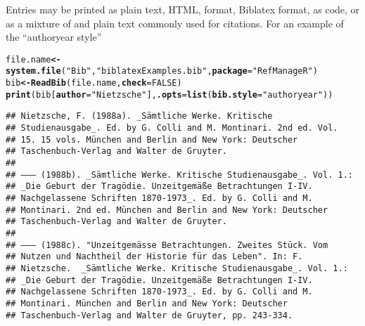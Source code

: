 \documentclass[article]{jss}\usepackage[]{graphicx}\usepackage[]{color}
\makeatletter
\newcommand{\hlnum}[1]{\textcolor[rgb]{0.125,0.125,1}{#1}}%
\newcommand{\hlstr}[1]{\textcolor[rgb]{0.125,0.125,1}{#1}}%
\newcommand{\hlstd}[1]{\textcolor[rgb]{0.251,0.251,0.282}{#1}}%
\newcommand{\hlkwb}[1]{\textcolor[rgb]{0.439,0.251,1}{\textbf{#1}}}%
\newcommand{\hlkwc}[1]{\textcolor[rgb]{0.529,0,0.184}{\textbf{#1}}}%
\newcommand{\hlkwd}[1]{\textcolor[rgb]{0.251,0.251,0.282}{\textbf{#1}}}%
\newenvironment{kframe}{%
 \def\at@end@of@kframe{}%
 \ifinner\ifhmode%
  \def\at@end@of@kframe{\end{minipage}}%
  \begin{minipage}{\columnwidth}%
 \fi\fi%
 \def\FrameCommand##1{\hskip\@totalleftmargin \hskip-\fboxsep
 \colorbox{shadecolor}{##1}\hskip-\fboxsep
     \hskip-\linewidth \hskip-\@totalleftmargin \hskip\columnwidth}%
 \MakeFramed {\advance\hsize-\width
   \@totalleftmargin\z@ \linewidth\hsize
   \@setminipage}}%
 {\par\unskip\endMakeFramed%
 \at@end@of@kframe}
\newenvironment{knitrout}{}{} %
\makeatother
\begin{document}
Entries may be printed as plain text, HTML, \Bibtex{} format, Biblatex{} format, as \R{} code, or as a mixture of \Bibtex and plain text commonly used for citations.  For an example of the ``authoryear style''
\begin{knitrout}
\color{fgcolor}\begin{kframe}
\begin{alltt}
\hlstd{file.name} \hlkwb{<-} \hlkwd{system.file}\hlstd{(}\hlstr{"Bib"}\hlstd{,} \hlstr{"biblatexExamples.bib"}\hlstd{,} \hlkwc{package} \hlstd{=} \hlstr{"RefManageR"}\hlstd{)}
\hlstd{bib} \hlkwb{<-} \hlkwd{ReadBib}\hlstd{(file.name,} \hlkwc{check} \hlstd{=} \hlnum{FALSE}\hlstd{)}
\hlkwd{print}\hlstd{(bib[}\hlkwc{author} \hlstd{=} \hlstr{"Nietzsche"}\hlstd{],} \hlkwc{.opts} \hlstd{=} \hlkwd{list}\hlstd{(}\hlkwc{bib.style} \hlstd{=} \hlstr{"authoryear"}\hlstd{))}
\end{alltt}
\begin{verbatim}
## Nietzsche, F. (1988a). _Sämtliche Werke. Kritische
## Studienausgabe_. Ed. by G. Colli and M. Montinari. 2nd ed. Vol.
## 15. 15 vols. München and Berlin and New York: Deutscher
## Taschenbuch-Verlag and Walter de Gruyter.
## 
## —–— (1988b). _Sämtliche Werke. Kritische Studienausgabe_. Vol. 1.:
## _Die Geburt der Tragödie. Unzeitgemäße Betrachtungen I-IV.
## Nachgelassene Schriften 1870-1973_. Ed. by G. Colli and M.
## Montinari. 2nd ed. München and Berlin and New York: Deutscher
## Taschenbuch-Verlag and Walter de Gruyter.
## 
## —–— (1988c). "Unzeitgemässe Betrachtungen. Zweites Stück. Vom
## Nutzen und Nachtheil der Historie für das Leben". In: F.
## Nietzsche.  _Sämtliche Werke. Kritische Studienausgabe_. Vol. 1.:
## _Die Geburt der Tragödie. Unzeitgemäße Betrachtungen I-IV.
## Nachgelassene Schriften 1870-1973_. Ed. by G. Colli and M.
## Montinari. München and Berlin and New York: Deutscher
## Taschenbuch-Verlag and Walter de Gruyter, pp. 243-334.
\end{verbatim}
\end{kframe}
\end{knitrout}
\end{document}
